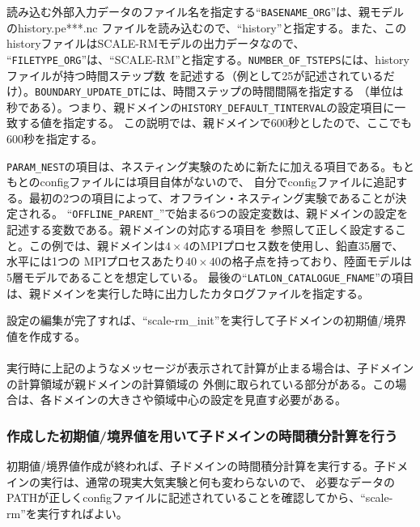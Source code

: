 \noindent 読み込む外部入力データのファイル名を指定する``\verb|BASENAME_ORG|''は、親モデルのhistory.pe***.nc
ファイルを読み込むので、``history''と指定する。また、このhistoryファイルはSCALE-RMモデルの出力データなので、
``\verb|FILETYPE_ORG|''は、``SCALE-RM''と指定する。\verb|NUMBER_OF_TSTEPS|には、historyファイルが持つ時間ステップ数
を記述する（例として25が記述されているだけ）。\verb|BOUNDARY_UPDATE_DT|には、時間ステップの時間間隔を指定する
（単位は秒である）。つまり、親ドメインの\verb|HISTORY_DEFAULT_TINTERVAL|の設定項目に一致する値を指定する。
この説明では、親ドメインで600秒としたので、ここでも600秒を指定する。

\verb|PARAM_NEST|の項目は、ネスティング実験のために新たに加える項目である。もともとのconfigファイルには項目自体がないので、
自分でconfigファイルに追記する。最初の2つの項目によって、オフライン・ネスティング実験であることが決定される。
``\verb|OFFLINE_PARENT_|''で始まる6つの設定変数は、親ドメインの設定を記述する変数である。親ドメインの対応する項目を
参照して正しく設定すること。この例では、親ドメインは$4 \times 4$のMPIプロセス数を使用し、鉛直35層で、水平には1つの
MPIプロセスあたり$40 \times 40$の格子点を持っており、陸面モデルは5層モデルであることを想定している。
最後の``\verb|LATLON_CATALOGUE_FNAME|''の項目は、親ドメインを実行した時に出力したカタログファイルを指定する。

設定の編集が完了すれば、``scale-rm\_init''を実行して子ドメインの初期値/境界値を作成する。\\

\\

\noindent 実行時に上記のようなメッセージが表示されて計算が止まる場合は、子ドメインの計算領域が親ドメインの計算領域の
外側に取られている部分がある。この場合は、各ドメインの大きさや領域中心の設定を見直す必要がある。


\subsubsection{作成した初期値/境界値を用いて子ドメインの時間積分計算を行う}
初期値/境界値作成が終われば、子ドメインの時間積分計算を実行する。子ドメインの実行は、通常の現実大気実験と何も変わらないので、
必要なデータのPATHが正しくconfigファイルに記述されていることを確認してから、``scale-rm''を実行すればよい。

